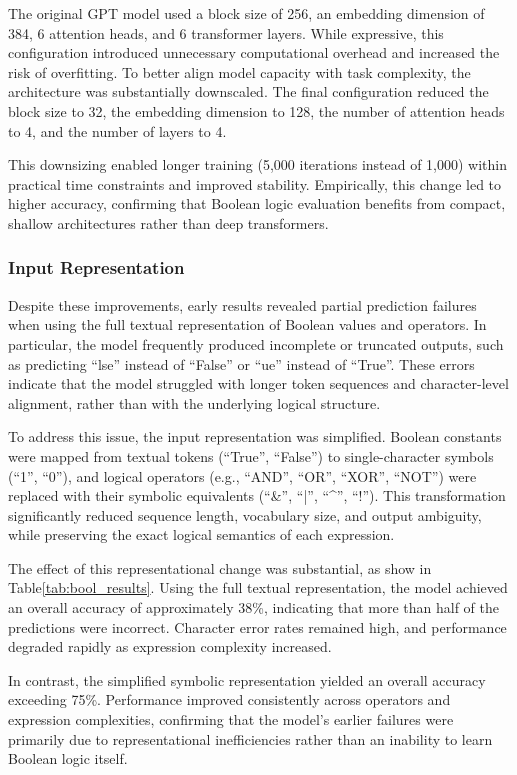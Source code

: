 The original GPT model used a block size of 256, an embedding dimension of 384, 6 attention heads, and 6 transformer layers. While expressive, this configuration introduced unnecessary computational overhead and increased the risk of overfitting. To better align model capacity with task complexity, the architecture was substantially downscaled. The final configuration reduced the block size to 32, the embedding dimension to 128, the number of attention heads to 4, and the number of layers to 4.

This downsizing enabled longer training (5,000 iterations instead of 1,000) within practical time constraints and improved stability. Empirically, this change led to higher accuracy, confirming that Boolean logic evaluation benefits from compact, shallow architectures rather than deep transformers.

\subsubsection{Input Representation}
Despite these improvements, early results revealed partial prediction failures when using the full textual representation of Boolean values and operators. In particular, the model frequently produced incomplete or truncated outputs, such as predicting “lse” instead of “False” or “ue” instead of “True”. These errors indicate that the model struggled with longer token sequences and character-level alignment, rather than with the underlying logical structure.

To address this issue, the input representation was simplified. Boolean constants were mapped from textual tokens (``True'', ``False'') to single-character symbols (``1'', ``0''), and logical operators (e.g., ``AND'', ``OR'', ``XOR'', ``NOT'') were replaced with their symbolic equivalents (``\&'', ``|'', ``\textasciicircum'', ``!''). This transformation significantly reduced sequence length, vocabulary size, and output ambiguity, while preserving the exact logical semantics of each expression.

The effect of this representational change was substantial, as show in Table\ref{tab:bool_results}. Using the full textual representation, the model achieved an overall accuracy of approximately 38\%, indicating that more than half of the predictions were incorrect. Character error rates remained high, and performance degraded rapidly as expression complexity increased.

In contrast, the simplified symbolic representation yielded an overall accuracy exceeding 75\%. Performance improved consistently across operators and expression complexities, confirming that the model's earlier failures were primarily due to representational inefficiencies rather than an inability to learn Boolean logic itself.

